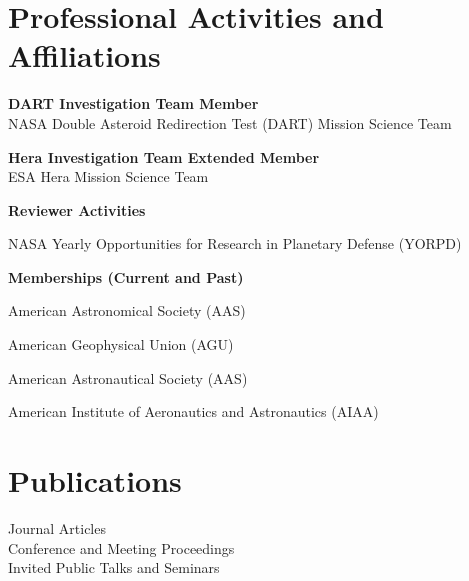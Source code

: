 \documentclass[margin,line]{res}
\newlength{\myitemspacing}
\newenvironment{list_new}{
    \begin{list}{\scriptsize{$\bullet$}}{%
        \setlength{\itemsep}{0in}
        \setlength{\parsep}{\myitemspacing} \setlength{\parskip}{0in}
        \setlength{\topsep}{0in} \setlength{\partopsep}{0in} 
        \setlength{\leftmargin}{0.2in}
        }}
    {\end{list}
}
\newif\ifallpubs
\begin{document}
\begin{resume}
\section{\sc Professional Activities and Affiliations}
{\bf DART Investigation Team Member}\\
NASA Double Asteroid Redirection Test (DART) Mission Science Team

{\bf Hera Investigation Team Extended Member}\\
ESA Hera Mission Science Team

{\bf Reviewer Activities}
\begin{list_new}
    \item NASA Yearly Opportunities for Research in Planetary Defense (YORPD)
\end{list_new}

{\bf Memberships (Current and Past)}
\begin{list_new}
    \item American Astronomical Society (AAS)
    \item American Geophysical Union (AGU)
    \item American Astronautical Society (AAS)
    \item American Institute of Aeronautics and Astronautics (AIAA)
\end{list_new}

\section{\sc Publications}
 Journal Articles\\
 Conference and Meeting Proceedings\\
 Invited Public Talks and Seminars

\begin{refsection}
\nocite{*}
\ifallpubs
\section{\sc Journal Articles}
\vspace{0.15in}
\printbibliography[heading=none]
\else
\fi
\end{refsection}

\begin{refsection}
\nocite{*}
\ifallpubs
\section{\sc Conference and Meeting Proceedings}
\vspace{0.15in}
\printbibliography[heading=none]
\else
\fi
\end{refsection}

\begin{refsection}
\nocite{*}
\ifallpubs
\section{\sc Invited Public Talks and Seminars}
\vspace{0.15in}
\printbibliography[heading=none]
\else
\fi
\end{refsection}

\end{resume}
\thispagestyle{lastpage}
\end{document}

